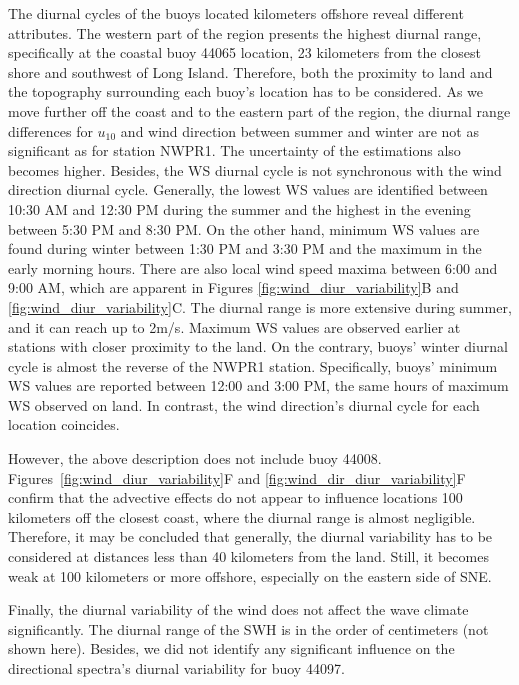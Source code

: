 The diurnal cycles of the buoys located kilometers offshore reveal different attributes. The western part of the region presents the highest diurnal range, specifically at the coastal buoy 44065 location, 23 kilometers from the closest shore and southwest of Long Island. Therefore, both the proximity to land and the topography surrounding each buoy's location has to be considered. As we move further off the coast and to the eastern part of the region, the diurnal range differences for $u_{10}$ and wind direction between summer and winter are not as significant as for station NWPR1. The uncertainty of the estimations also becomes higher. Besides, the WS diurnal cycle is not synchronous with the wind direction diurnal cycle. Generally, the lowest WS values are identified between 10:30 AM and 12:30 PM during the summer and the highest in the evening between 5:30 PM and 8:30 PM. On the other hand, minimum WS values are found during winter between 1:30 PM and 3:30 PM and the maximum in the early morning hours. There are also local wind speed maxima between 6:00 and 9:00 AM, which are apparent in Figures \ref{fig:wind_diur_variability}B and \ref{fig:wind_diur_variability}C. The diurnal range is more extensive during summer, and it can reach up to 2m/s. Maximum WS values are observed earlier at stations with closer proximity to the land.  On the contrary, buoys' winter diurnal cycle is almost the reverse of the NWPR1 station. Specifically, buoys' minimum WS values are reported between 12:00 and 3:00 PM, the same hours of maximum WS observed on land. In contrast, the wind direction's diurnal cycle for each location coincides.

However, the above description does not include buoy 44008. Figures~\ref{fig:wind_diur_variability}F and \ref{fig:wind_dir_diur_variability}F confirm that the advective effects do not appear to influence locations 100 kilometers off the closest coast, where the diurnal range is almost negligible. Therefore, it may be concluded that generally, the diurnal variability has to be considered at distances less than 40 kilometers from the land. Still, it becomes weak at 100 kilometers or more offshore, especially on the eastern side of SNE.

Finally, the diurnal variability of the wind does not affect the wave climate significantly. The diurnal range of the SWH is in the order of centimeters (not shown here). Besides, we did not identify any significant influence on the directional spectra's diurnal variability for buoy 44097.



